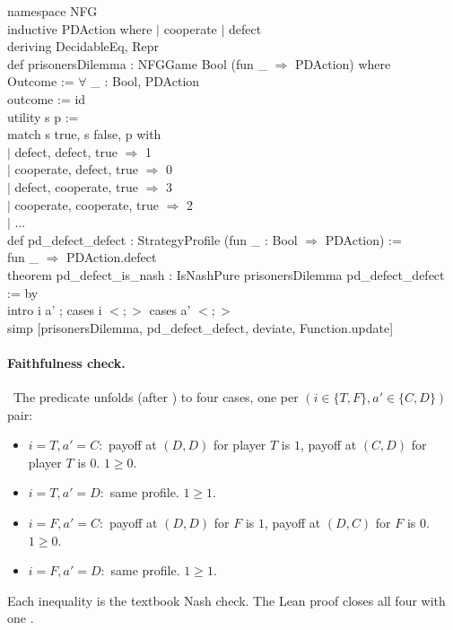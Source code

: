 \begin{leanbox}
namespace NFG\\[1pt]
inductive PDAction where $\mid$ cooperate $\mid$ defect\\
deriving DecidableEq, Repr\\[3pt]
def prisonersDilemma : NFGGame Bool (fun \_ $\Rightarrow$ PDAction) where\\
\bd Outcome := $\forall$ \_ : Bool, PDAction\\
\bd outcome := id\\
\bd utility s p :=\\
\bdd match s true, s false, p with\\
\bdd $\mid$ defect, defect, true $\Rightarrow$ 1\\
\bdd $\mid$ cooperate, defect, true $\Rightarrow$ 0\\
\bdd $\mid$ defect, cooperate, true $\Rightarrow$ 3\\
\bdd $\mid$ cooperate, cooperate, true $\Rightarrow$ 2\\
\bdd $\mid$ ...\\[3pt]
def pd\_defect\_defect : StrategyProfile (fun \_ : Bool $\Rightarrow$ PDAction) :=\\
\bd fun \_ $\Rightarrow$ PDAction.defect\\[3pt]
theorem pd\_defect\_is\_nash : IsNashPure prisonersDilemma pd\_defect\_defect := by\\
\bd intro i a' ; cases i $<;>$ cases a' $<;>$\\
\bdd simp [prisonersDilemma, pd\_defect\_defect, deviate, Function.update]
\end{leanbox}

\paragraph{Faithfulness check.}\
The predicate 
unfolds (after ) to four cases, one per
$(i \in \{T, F\}, a' \in \{C, D\})$ pair:
\begin{itemize}\itemsep1pt
\item $i = T, a' = C$:\ payoff at $(D, D)$ for player $T$ is $1$,
  payoff at $(C, D)$ for player $T$ is $0$.  $1 \ge 0$. \checkmark
\item $i = T, a' = D$:\ same profile.  $1 \ge 1$. \checkmark
\item $i = F, a' = C$:\ payoff at $(D, D)$ for $F$ is $1$, payoff
  at $(D, C)$ for $F$ is $0$.  $1 \ge 0$. \checkmark
\item $i = F, a' = D$:\ same profile.  $1 \ge 1$. \checkmark
\end{itemize}
Each inequality is the textbook Nash check.  The Lean proof closes
all four with one \TT{simp}.

